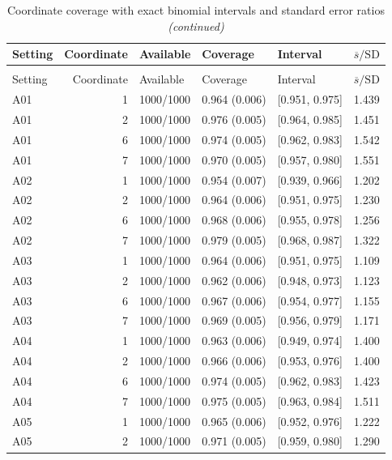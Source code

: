 
\begin{longtable}[t]{lrllll}
\caption{\label{tab:registered-joint-coordinates}Coordinate coverage with exact binomial intervals and standard error ratios}\\
\toprule
Setting & Coordinate & Available & Coverage & Interval & $\overline{s}/\mathrm{SD}$\\
\midrule
\endfirsthead
\caption[]{Coordinate coverage with exact binomial intervals and standard error ratios \textit{(continued)}}\\
\toprule
Setting & Coordinate & Available & Coverage & Interval & $\overline{s}/\mathrm{SD}$\\
\midrule
\endhead

\endfoot
\bottomrule
\endlastfoot
A01 & 1 & 1000/1000 & 0.964 (0.006) & {}[0.951, 0.975] & 1.439\\
A01 & 2 & 1000/1000 & 0.976 (0.005) & {}[0.964, 0.985] & 1.451\\
A01 & 6 & 1000/1000 & 0.974 (0.005) & {}[0.962, 0.983] & 1.542\\
A01 & 7 & 1000/1000 & 0.970 (0.005) & {}[0.957, 0.980] & 1.551\\
A02 & 1 & 1000/1000 & 0.954 (0.007) & {}[0.939, 0.966] & 1.202\\
A02 & 2 & 1000/1000 & 0.964 (0.006) & {}[0.951, 0.975] & 1.230\\
A02 & 6 & 1000/1000 & 0.968 (0.006) & {}[0.955, 0.978] & 1.256\\
A02 & 7 & 1000/1000 & 0.979 (0.005) & {}[0.968, 0.987] & 1.322\\
A03 & 1 & 1000/1000 & 0.964 (0.006) & {}[0.951, 0.975] & 1.109\\
A03 & 2 & 1000/1000 & 0.962 (0.006) & {}[0.948, 0.973] & 1.123\\
A03 & 6 & 1000/1000 & 0.967 (0.006) & {}[0.954, 0.977] & 1.155\\
A03 & 7 & 1000/1000 & 0.969 (0.005) & {}[0.956, 0.979] & 1.171\\
A04 & 1 & 1000/1000 & 0.963 (0.006) & {}[0.949, 0.974] & 1.400\\
A04 & 2 & 1000/1000 & 0.966 (0.006) & {}[0.953, 0.976] & 1.400\\
A04 & 6 & 1000/1000 & 0.974 (0.005) & {}[0.962, 0.983] & 1.423\\
A04 & 7 & 1000/1000 & 0.975 (0.005) & {}[0.963, 0.984] & 1.511\\
A05 & 1 & 1000/1000 & 0.965 (0.006) & {}[0.952, 0.976] & 1.222\\
A05 & 2 & 1000/1000 & 0.971 (0.005) & {}[0.959, 0.980] & 1.290\\

\end{longtable}
